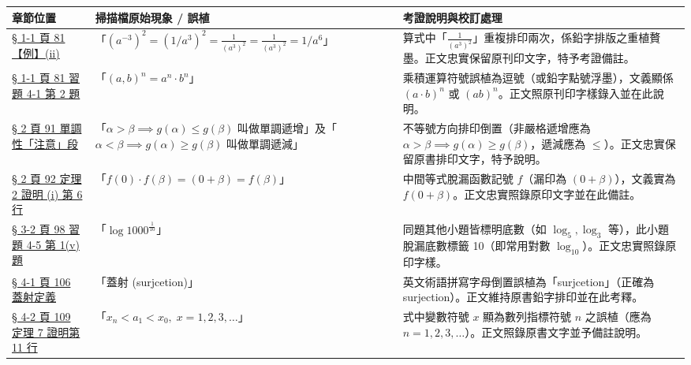 \documentclass[a4paper,12pt,twoside]{article}
\begin{document}
\begin{table}[H]
\centering
\small
\renewcommand{\arraystretch}{1.35}
\begin{tabularx}{\textwidth}{|p{3.2cm}|p{3.6cm}|X|}
\hline
\textbf{章節位置} & \textbf{掃描檔原始現象 / 誤植} & \textbf{考證說明與校訂處理} \\ \hline

\hyperref[note:b2-ch4-p81-duplicate]{§ 1-1 頁 81 【例】(ii)} & 
「$(a^{-3})^2 = (1/a^3)^2 = \frac{1}{(a^3)^2} = \frac{1}{(a^3)^2} = 1/a^6$」 & 
算式中「$\frac{1}{(a^3)^2}$」重複排印兩次，係鉛字排版之重植贅墨。正文忠實保留原刊印文字，特予考證備註。 \\ \hline

\hyperref[note:b2-ch4-p81-comma]{§ 1-1 頁 81 習題 4-1 第 2 題} & 
「$(a, b)^n = a^n \cdot b^n$」 & 
乘積運算符號誤植為逗號（或鉛字點號浮墨），文義顯係 $(a\cdot b)^n$ 或 $(ab)^n$。正文照原刊印字樣錄入並在此說明。 \\ \hline

\hyperref[note:b2-ch4-p91-monotonicity]{§ 2 頁 91 單調性「注意」段} & 
「$\alpha > \beta \implies g(\alpha) \le g(\beta)$ 叫做單調遞增」及「$\alpha < \beta \implies g(\alpha) \ge g(\beta)$ 叫做單調遞減」 & 
不等號方向排印倒置（非嚴格遞增應為 $\alpha > \beta \implies g(\alpha) \ge g(\beta)$，遞減應為 $\le$）。正文忠實保留原書排印文字，特予說明。 \\ \hline

\hyperref[note:b2-ch4-p92-missing-f]{§ 2 頁 92 定理 2 證明 (i) 第 6 行} & 
「$f(0)\cdot f(\beta) = (0+\beta) = f(\beta)$」 & 
中間等式脫漏函數記號 $f$（漏印為 $(0+\beta)$），文義實為 $f(0+\beta)$。正文忠實照錄原印文字並在此備註。 \\ \hline

\hyperref[note:b2-ch4-p98-log-base]{§ 3-2 頁 98 習題 4-5 第 1(v) 題} & 
「$\log 1000^{\frac{1}{10}}$」 & 
同題其他小題皆標明底數（如 $\log_5, \log_3$ 等），此小題脫漏底數標籤 10（即常用對數 $\log_{10}$）。正文忠實照錄原印字樣。 \\ \hline

\hyperref[note:b2-ch4-p106-surjcetion]{§ 4-1 頁 106 蓋射定義} & 
「蓋射 (surjcetion)」 & 
英文術語拼寫字母倒置誤植為「surjcetion」（正確為 surjection）。正文維持原書鉛字排印並在此考釋。 \\ \hline

\hyperref[note:b2-ch4-p109-index-x]{§ 4-2 頁 109 定理 7 證明第 11 行} & 
「$x_n < a_1 < x_0,\; x = 1, 2, 3, \dots$」 & 
式中變數符號 $x$ 顯為數列指標符號 $n$ 之誤植（應為 $n = 1, 2, 3, \dots$）。正文照錄原書文字並予備註說明。 \\ \hline

\end{tabularx}
\end{table}

\clearpage
\tableofcontents
\newpage


\end{document}
